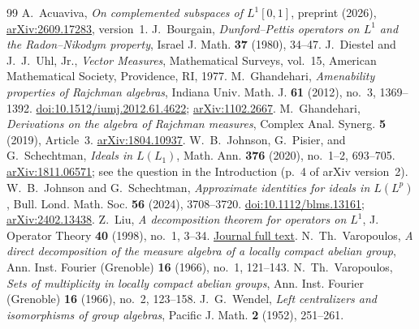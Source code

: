 \documentclass[11pt,reqno]{amsart}
\theoremstyle{definition}
\theoremstyle{remark}
\begin{document}
\clearpage
\begin{thebibliography}{99}
 A.~Acuaviva, \emph{On complemented subspaces of $L^1[0,1]$}, preprint (2026), \href{https://arxiv.org/abs/2609.17283}{arXiv:2609.17283}, version~1.
 J.~Bourgain, \emph{Dunford--Pettis operators on $L^1$ and the Radon--Nikodym property}, Israel J. Math. \textbf{37} (1980), 34--47.
 J.~Diestel and J.~J.~Uhl, Jr., \emph{Vector Measures}, Mathematical Surveys, vol.~15, American Mathematical Society, Providence, RI, 1977.
 M.~Ghandehari, \emph{Amenability properties of Rajchman algebras}, Indiana Univ. Math. J. \textbf{61} (2012), no.~3, 1369--1392. \href{https://doi.org/10.1512/iumj.2012.61.4622}{doi:10.1512/iumj.2012.61.4622}; \href{https://arxiv.org/abs/1102.2667}{arXiv:1102.2667}.
 M.~Ghandehari, \emph{Derivations on the algebra of Rajchman measures}, Complex Anal. Synerg. \textbf{5} (2019), Article~3. \href{https://arxiv.org/abs/1804.10937}{arXiv:1804.10937}.
 W.~B.~Johnson, G.~Pisier, and G.~Schechtman, \emph{Ideals in $L(L_1)$}, Math. Ann. \textbf{376} (2020), no.~1--2, 693--705. \href{https://arxiv.org/abs/1811.06571}{arXiv:1811.06571}; see the question in the Introduction (p.~4 of arXiv version~2).
 W.~B.~Johnson and G.~Schechtman, \emph{Approximate identities for ideals in $L(L^p)$}, Bull. Lond. Math. Soc. \textbf{56} (2024), 3708--3720. \href{https://doi.org/10.1112/blms.13161}{doi:10.1112/blms.13161}; \href{https://arxiv.org/abs/2402.13438}{arXiv:2402.13438}.
 Z.~Liu, \emph{A decomposition theorem for operators on $L^1$}, J. Operator Theory \textbf{40} (1998), no.~1, 3--34. \href{https://www.theta.ro/jot/archive/1998-040-001/1998-040-001-001.pdf}{Journal full text}.
 N.~Th.~Varopoulos, \emph{A direct decomposition of the measure algebra of a locally compact abelian group}, Ann. Inst. Fourier (Grenoble) \textbf{16} (1966), no.~1, 121--143.
 N.~Th.~Varopoulos, \emph{Sets of multiplicity in locally compact abelian groups}, Ann. Inst. Fourier (Grenoble) \textbf{16} (1966), no.~2, 123--158.
 J.~G.~Wendel, \emph{Left centralizers and isomorphisms of group algebras}, Pacific J. Math. \textbf{2} (1952), 251--261.
\end{thebibliography}
\end{document}
